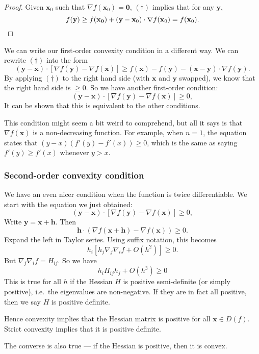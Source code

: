 \documentclass[a4paper]{article}
\begin{document}
\begin{proof}
  Given $\mathbf{x}_0$ such that $\nabla f(\mathbf{x}_0) = \mathbf{0}$, $(\dagger)$ implies that for any $\mathbf{y}$,
  \[
    f(\mathbf{y}) \geq f(\mathbf{x_0}) + (\mathbf{y} - \mathbf{x}_0)\cdot \nabla f(\mathbf{x}_0) = f(\mathbf{x}_0). \qedhere
  \]
\end{proof}
We can write our first-order convexity condition in a different way. We can rewrite $(\dagger)$ into the form
\[
  (\mathbf{y} - \mathbf{x}) \cdot [\nabla f(\mathbf{y}) - \nabla f(\mathbf{x})] \geq f(\mathbf{x}) - f(\mathbf{y}) - (\mathbf{x} - \mathbf{y}) \cdot \nabla f(\mathbf{y}).
\]
By applying $(\dagger)$ to the right hand side (with $\mathbf{x}$ and $\mathbf{y}$ swapped), we know that the right hand side is $\geq 0$. So we have another first-order condition:
\[
  (\mathbf{y} - \mathbf{x})\cdot [\nabla f(\mathbf{y}) - \nabla f(\mathbf{x})] \geq 0,
\]
It can be shown that this is equivalent to the other conditions.

This condition might seem a bit weird to comprehend, but all it says is that $\nabla f(\mathbf{x})$ is a non-decreasing function. For example, when $n = 1$, the equation states that $(y - x)(f'(y) - f'(x)) \geq 0$, which is the same as saying $f'(y) \geq f'(x)$ whenever $y > x$.

\subsubsection{Second-order convexity condition}
We have an even nicer condition when the function is twice differentiable. We start with the equation we just obtained:
\[
  (\mathbf{y} - \mathbf{x})\cdot [\nabla f(\mathbf{y}) - \nabla f(\mathbf{x})] \geq 0,
\]
Write $\mathbf{y} = \mathbf{x} + \mathbf{h}$. Then
\[
  \mathbf{h} \cdot (\nabla f(\mathbf{x} + \mathbf{h}) - \nabla f(\mathbf{x})) \geq 0.
\]
Expand the left in Taylor series. Using suffix notation, this becomes
\[
  h_i [h_j \nabla_j \nabla_i f + O(h^2)] \geq 0.
\]
But $\nabla_j \nabla_i f = H_{ij}$. So we have
\[
  h_i H_{ij}h_j + O(h^3) \geq 0
\]
This is true for all $h$ if the Hessian $H$ is positive semi-definite (or simply positive), i.e.\ the eigenvalues are non-negative. If they are in fact all positive, then we say $H$ is positive definite.

Hence convexity implies that the Hessian matrix is positive for all $\mathbf{x}\in D(f)$. Strict convexity implies that it is positive definite.

The converse is also true --- if the Hessian is positive, then it is convex.
\end{document}
